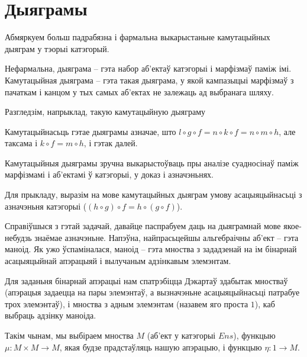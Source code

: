 \documentclass[a4paper,12pt]{book}
\begin{document}
\section{Дыяграмы}

Абмяркуем больш падрабязна і фармальна выкарыстаньне камутацыйных
дыяграм у тэорыі катэгорый.

Нефармальна, дыяграма -- гэта набор аб'ектаў катэгорыі і марфізмаў
паміж імі. Камутацыйная дыяграма -- гэта такая дыяграма, у якой
кампазыцыі марфізмаў з пачаткам і канцом у тых самых аб'ектах не
залежаць ад выбранага шляху.

Разгледзім, напрыклад, такую камутацыйную дыяграму


Камутацыйнасьць гэтае дыяграмы азначае, што $l \circ g \circ f = n
\circ k \circ f = n \circ m \circ h$, але таксама і $k \circ f = m
\circ h$, і гэтак далей.

Камутацыйныя дыяграмы зручна выкарыстоўваць пры аналізе суадносінаў
паміж марфізмамі і аб'ектамі ў катэгорыі, у доказ і азначэньнях.

Для прыкладу, выразім на мове камутацыйных дыяграм умову
асацыяцыйнасьці з азначэньня катэгорыі ($(h \circ g) \circ f = h
\circ (g \circ f)$).


Справіўшыся з гэтай задачай, давайце паспрабуем даць на дыяграмнай
мове якое-небудзь знаёмае азначэньне. Напэўна, найпрасьцейшы
альгебраічны аб'ект -- гэта маноід. Як ужо ўспаміналася, маноід --
гэта мноства з зададзенай на ім бінарнай асацыяцыйнай апэрацыяй і
вылучаным адзінкавым элемэнтам.

Для заданьня бінарнай апэрацыі нам спатрэбіцца Дэкартаў здабытак
мностваў (апэрацыя задаецца на пары элемэнтаў, а вызначэньне
асацыяцыйнасьці патрабуе трох элемэнтаў), і мноства з адным
элемэнтам (назавем яго проста $1$), каб выбраць адзінку маноіда.

Такім чынам, мы выбіраем мноства $M$ (аб'ект у катэгорыі $Ens$),
функцыю $\mu: M \times M \rightarrow M$, якая будзе прадстаўляць
нашую апэрацыю, і функцыю $\eta: 1 \rightarrow M$.
\end{document}
